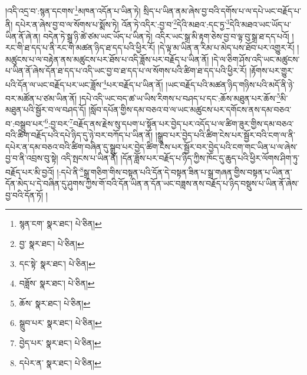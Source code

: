 །འདི་འདྲ་བ་:སྙན་དངགས་\footnote{སྙན་ངག་  སྣར་ཐང་།  པེ་ཅིན། }མཁན་འདོན་པ་ཡིན་ཏེ། སྲིད་པ་ཡིན་ནམ་ཞེས་བྱ་བའི་དགོས་པ་ལ་དཔེ་ཡང་བརྗོད་པ་ནི། དཔེར་ན་ཞེས་བྱ་བ་ལ་སོགས་པ་སྨོས་ཏེ། འོན་ཏེ་འདིར་:བྱ་བ་\footnote{བྱ་  སྣར་ཐང་།  པེ་ཅིན། }དེའི་མཐའ་:དང་ཏྱ་\footnote{དང་སྟེ་  སྣར་ཐང་།  པེ་ཅིན། }དེའི་མཐའ་ཡང་ཡོད་པ་ཡིན་ནོ་ཞེ་ན། བདེན་ཏེ་སྒྲ་ཉི་ཚེ་ཙམ་ཡང་ཡོད་པ་ཡིན་ཏེ། འདིར་ཡང་སྒྲ་མི་རྟག་ཅེས་བྱ་བ་ལྟ་བུ་སྒྲ་ཐ་དད་པའོ། །རང་གི་ཐ་དད་པ་ནི་རང་གི་མཚན་ཉིད་ཐ་དད་པའི་ཕྱིར་རོ། །དེ་ལྟ་མ་ཡིན་ན་རིམ་པ་མེད་པས་ཐོབ་པར་འགྱུར་རོ། །མཚུངས་པ་ལ་བརྟེན་ནས་མཚུངས་པར་ཐོས་པ་འདི་ཟློས་པར་བརྗོད་པ་ཡིན་ནོ། །དེ་ལ་ཅིག་ཤོས་འདི་ཡང་མཚུངས་པ་ཡིན་ནོ་ཞེས་དོན་ཐ་དད་པ་འདི་ཡང་བྱ་བ་ཐ་དད་པ་ལ་སོགས་པའི་ཚིག་ཐ་དད་པའི་ཕྱིར་རོ། །རྟོགས་པར་གྱུར་པའི་དོན་ལ་ཡང་བརྗོད་པར་ཡང་ཟློས་\footnote{བཟློས་  སྣར་ཐང་།  པེ་ཅིན། }པར་བརྗོད་པ་ཡིན་ནོ། །ཡང་བརྗོད་པའི་མཚན་ཉིད་གཉིས་པའི་མདོ་ནི་ཉེ་བར་མཚོན་པ་ཙམ་ཡིན་ནོ། །དཔེ་འདི་ཡང་བད་ཚ་ཡ་ཡིས་རིགས་པ་བཤད་པ་དང་:ཆོས་མཐུན་པར་ཆོས་\footnote{ཆོས་  སྣར་ཐང་།  པེ་ཅིན། }མི་མཐུན་པའི་སྦྱོར་བ་ལ་བཤད་དོ། །སློབ་དཔོན་གྱིས་དམ་བཅའ་བ་ལ་ཡང་མཚུངས་པར་དགོངས་ནས་དམ་བཅའ་བ་:བསྒྲུབ་པར་\footnote{སྒྲུབ་པར་  སྣར་ཐང་།  པེ་ཅིན། }:བྱ་བར་\footnote{བྱེད་པར་  སྣར་ཐང་།  པེ་ཅིན། }བརྗོད་ནས་རྗེས་སུ་དཔག་པ་སྟོན་པར་བྱེད་པར་འདོད་པ་ལ་ཚིག་ཟུར་གྱིས་དམ་བཅའ་བའི་ཚིག་བརྗོད་པའི་དཔེ་ཉིད་དུ་ཉེ་བར་བཀོད་པ་ཡིན་ནོ། །སྒྲུབ་པར་བྱེད་པའི་ཚིག་ངེས་པར་སྦྱོར་བའི་ངག་ལ་ནི་དཔེར་ན་དམ་བཅའ་བའི་ཚིག་བཞིན་དུ་སྒྲུབ་པར་བྱེད་ཚིག་ངེས་པར་སྦྱོར་བར་བྱེད་པའི་ངག་གང་ཡིན་པ་ལ་ཞེས་བྱ་བ་ནི་འབྲས་བུ་སྟེ། འདི་སྤངས་པ་ཡིན་ནོ། །དོན་ཟློས་པར་བརྗོད་པ་ཉིད་ཀྱིས་ཁོང་དུ་ཆུད་པའི་ཕྱིར་ལོགས་ཤིག་ཏུ་བརྗོད་པར་མི་བྱའོ། །:དཔེ་ནི་\footnote{དཔེར་ན་  སྣར་ཐང་།  པེ་ཅིན། }སྒྲ་གཅིག་གིས་བསྟན་པའི་དོན་དེ་བསྟན་ཟིན་པ་སྒྲ་གཞན་གྱིས་བསྟན་པ་ཡིན་ན་དོན་མེད་པ་དེ་བཞིན་དུ་ཤུགས་ཀྱིས་གོ་བའི་དོན་ཡིན་ན་དོན་ཡང་བཟླས་ནས་བརྗོད་པ་ཉིད་བསྡུས་པ་ཡིན་ནོ་ཞེས་བྱ་བའི་དོན་ཏོ། །
